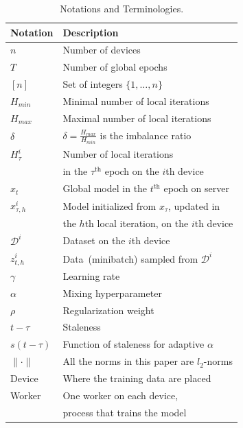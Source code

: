 \documentclass{opt2020} %
\begin{document}
\vspace{-0.5cm}
\noindent
\begin{minipage}[t]{0.47\textwidth}
\begin{table}[H]
\caption{Notations and Terminologies.}\vspace{-0.3cm}
\label{tbl:notations}
\begin{center}
\begingroup
\small
\renewcommand{\arraystretch}{0.5}
\setlength{\tabcolsep}{3pt}
\begin{tabular}{|l|l|}
\hline
{\bf Notation}  & {\bf Description} \\ \hline
$n$    & Number of devices \\ \hline
$T$    & Number of global epochs  \\ \hline
$[n]$    & Set of integers $\{1, \ldots, n \}$  \\ \hline
$H_{min}$    & Minimal number of local iterations  \\ \hline
$H_{max}$  & Maximal number of local iterations  \\ \hline
$\delta$    & $\delta = \frac{H_{max}}{H_{min}}$ is the imbalance ratio  \\ \hline
$H^i_\tau$    & Number of local iterations \\ & in the $\tau^{\mbox{th}}$ epoch  on the $i$th device \\ \hline
$x_t$    & Global model in the $t^{\mbox{th}}$ epoch on server  \\ \hline
$x^i_{\tau,h}$    & Model initialized from $x_\tau$, updated in \\ & the $h$th local iteration, on the $i$th device  \\ \hline
$\mathcal{D}^i$    & Dataset on the $i$th device  \\ \hline
$z^i_{t, h}$    & Data~(minibatch) sampled from $\mathcal{D}^i$  \\ \hline
$\gamma$    & Learning rate  \\ \hline
$\alpha$    & Mixing hyperparameter  \\ \hline
$\rho$    & Regularization weight  \\ \hline
$t-\tau$    & Staleness  \\ \hline
$s(t-\tau)$    & Function of staleness for adaptive $\alpha$  \\ \hline
$\| \cdot \|$    & All the norms in this paper are $l_2$-norms  \\ \hline
Device    & Where the training data are placed  \\ \hline
Worker    & One worker on each device, \\ & process that trains the model  \\ \hline
\end{tabular}
\endgroup
\end{center}
\end{table}
\end{minipage}
\end{document}
